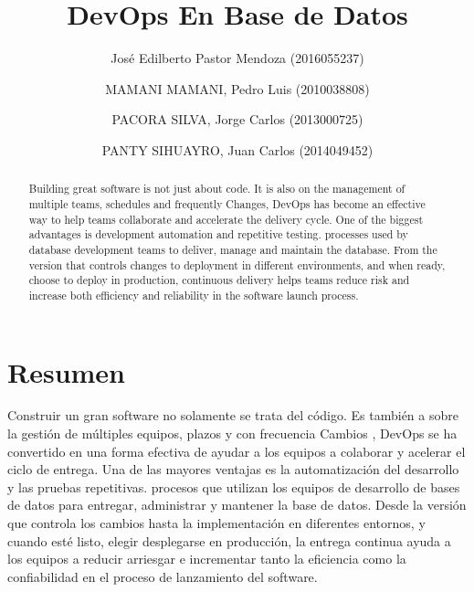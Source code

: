 \documentclass[preprint,12pt]{elsarticle}
\begin{document}
	


	\begin{frontmatter}

		\title{\huge  DevOps En Base de Datos}
		
		\author{José Edilberto Pastor Mendoza              (2016055237)}
		\author{MAMANI MAMANI, Pedro Luis              (2010038808)}
		\author{PACORA SILVA, Jorge Carlos                   (2013000725)}
		\author{PANTY SIHUAYRO, Juan Carlos               (2014049452)}
		
		\address{Tacna, Perú}
		
		\begin{abstract}
			
Building great software is not just about code. It is also on the management of multiple teams, schedules and frequently Changes, DevOps has become an effective way to help teams collaborate and accelerate the delivery cycle. One of the biggest advantages is development automation and repetitive testing. processes used by database development teams to deliver, manage and maintain the database. From the version that controls changes to deployment in different environments, and when ready, choose to deploy in production, continuous delivery helps teams reduce risk and increase both efficiency and reliability in the software launch process.


		\end{abstract}
\end{frontmatter}

	\section{Resumen}

Construir un gran software no solamente se trata del código. Es también a
sobre la gestión de múltiples equipos, plazos y con frecuencia
Cambios , DevOps se ha convertido en una forma efectiva de ayudar a los equipos a colaborar y acelerar el ciclo de entrega.
Una de las mayores ventajas es la automatización del desarrollo y las pruebas repetitivas.
procesos que utilizan los equipos de desarrollo de bases de datos para entregar, administrar y mantener la base de datos. Desde la versión que controla los cambios hasta la implementación en diferentes entornos, y cuando esté listo, elegir desplegarse en producción, la entrega continua ayuda a los equipos a reducir
arriesgar e incrementar tanto la eficiencia como la confiabilidad en el proceso de lanzamiento del software.
\end{document}
